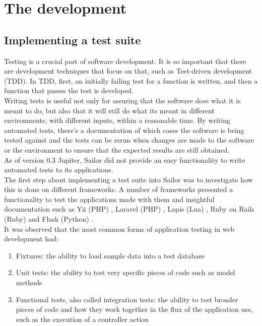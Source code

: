 \documentclass{article}
\begin{document}
\newpage
\section{The development}

\subsection{Implementing a test suite}

Testing is a crucial part of software development. It is so important that there are development techniques that focus on that, such as Test-driven development (TDD). In TDD, first, an initially failing test for a function is written, and then a function that passes the test is developed. \\

Writing tests is useful not only for assuring that the software does what it is meant to do, but also that it will still do what its meant in different environments, with different inputs, within a reasonable time. By writing automated tests, there's a documentation of which cases the software is being tested against and the tests can be rerun when changes are made to the software or the environment to ensure that the expected results are still obtained.\\

As of version 0.3 Jupiter, Sailor did not provide an easy functionality to write automated tests to its applications.\\

The first step about implementing a test suite into Sailor was to investigate how this is done on different frameworks. A number of frameworks presented a functionality to test the applications made with them and insightful documentation such as Yii (PHP)\autocite{yiiguide} , Laravel (PHP)\autocite{laravel} , Lapis (Lua)\autocite{lapis} , Ruby on Rails (Ruby)\autocite{rails}  and Flask (Python)\autocite{flask} .\\

It was observed that the most common forms of application testing in web development had:\\

\begin{enumerate}
\item Fixtures: the ability to load sample data into a test database
\item Unit tests: the ability to test very specific pieces of code such as model methods
\item Functional tests, also called integration tests: the ability to test broader pieces of code and how they work together in the flux of the application use, such as the execution of a controller action
\end{enumerate}\\
\end{document}
